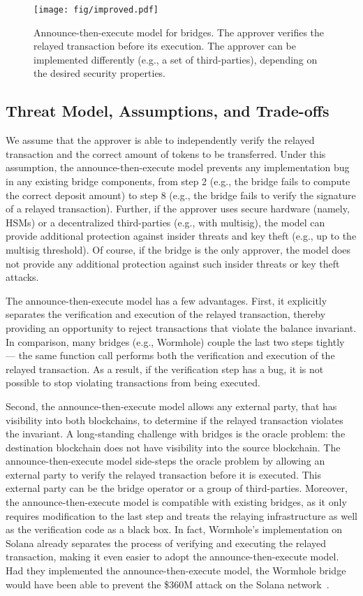 \begin{figure}[t]
\centering
\texttt{[image: fig/improved.pdf]}
\caption[Announce-then-Execute Model for Bridges]{Announce-then-execute model for bridges. The approver verifies the relayed transaction before its execution. The approver can be implemented differently (e.g., a set of third-parties), depending on the desired security properties.}
\label{fig:improved-arch}
\end{figure}


\subsection{Threat Model, Assumptions, and Trade-offs}
We assume that the approver is able to independently verify the relayed transaction and the correct amount of tokens to be transferred. Under this assumption, the announce-then-execute model prevents any implementation bug in any existing bridge components, from step 2 (e.g., the bridge fails to compute the correct deposit amount) to step 8 (e.g., the bridge fails to verify the signature of a relayed transaction). Further, if the 
approver uses secure hardware (namely, HSMs) or a decentralized third-parties
(e.g., with multisig), the model can provide additional protection against
insider threats and key theft (e.g., up to the multisig threshold). Of course,
if the bridge is the only approver, the model does not provide any additional
protection against such insider threats or key theft attacks.


The announce-then-execute model has a few advantages. First, it
explicitly separates the verification and execution of the relayed
transaction, thereby providing an opportunity to reject transactions
that violate the balance invariant.  In comparison, many bridges (e.g.,
Wormhole) couple the last two steps tightly --- the same function call
performs both the verification and execution of the relayed
transaction.  As a result, if the verification step has a bug, it is
not possible to stop violating transactions from being
executed.

Second, the announce-then-execute model allows any external
party, that has visibility into both blockchains, to determine if the
relayed transaction violates the invariant. A long-standing challenge
with bridges is the oracle problem: the destination blockchain does
not have visibility into the source blockchain. The
announce-then-execute model side-steps the oracle problem by allowing
an external party to verify the relayed transaction before it is
executed. This external party can be the bridge operator or a group of third-parties.
Moreover, the announce-then-execute model is compatible with
existing bridges, as it only requires modification to the last step
and treats the relaying infrastructure as well as the verification
code as a black box. In fact, Wormhole's implementation on Solana already separates the process of verifying and executing the relayed transaction, making it even easier to adopt the announce-then-execute model. Had they implemented the announce-then-execute model, the Wormhole bridge would have been able to prevent the \$360M attack on the Solana network~\cite{wormholeattack}.

